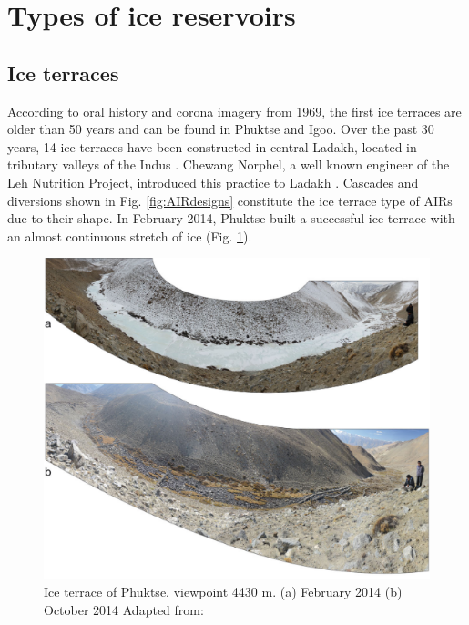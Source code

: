 \section{Types of ice reservoirs}

\subsection{Ice terraces}

According to oral history and corona imagery from 1969, the first ice terraces are older than 50 years and can
be found in Phuktse and Igoo. Over the past 30 years, 14 ice terraces have been constructed in central Ladakh,
located in tributary valleys of the Indus \citep{norphelArtificialGlacierHigh2009,
nusserSociohydrologyArtificialGlaciers2019}. Chewang Norphel, a well known engineer of the Leh Nutrition
Project, introduced this practice to Ladakh \citep{vinceGlacierMan2009}. Cascades and diversions shown in Fig.
\ref{fig:AIRdesigns} constitute the ice terrace type of AIRs due to their shape. In February 2014, Phuktse built
a successful ice terrace with an almost continuous stretch of ice (Fig. \ref{fig:ITexample}).

\begin{figure}[htb]
\centering
\includegraphics[width=12cm]{figs/IT_example.png}
\caption{Ice terrace of Phuktse, viewpoint 4430 m. (a) February 2014 (b) October 2014 Adapted from: \cite{nusserSociohydrologyArtificialGlaciers2019}}
\label{fig:ITexample}
\end{figure}

